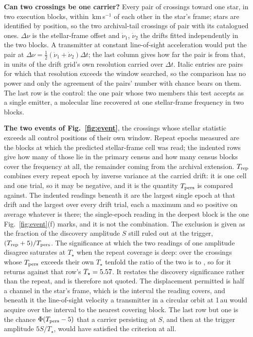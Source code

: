 \begin{table}
\centering
\caption{\textbf{Can two crossings be one carrier?} Every pair of crossings
toward one star, in two execution blocks, within
\WdHalfKms\,km\,s$^{-1}$ of each other in the star's frame; stars are
identified by position, so the two archival-tail crossings of \TjDeepStar{}
pair with its catalogued ones. $\Delta\nu$ is the stellar-frame offset and
$\dot\nu_1$, $\dot\nu_2$ the drifts fitted independently in the two blocks.
A transmitter at constant line-of-sight acceleration would put the pair at
$\Delta\nu=\frac{1}{2}(\dot\nu_1+\dot\nu_2)\Delta t$; the last column gives
how far the pair is from that, in units of the drift grid's own resolution
carried over $\Delta t$. Italic entries are pairs for which that resolution
exceeds the window searched, so the comparison has no power and only the
agreement of the pairs' number with chance bears on them. The last row is the
control: the one pair whose two members this test accepts as a single
emitter, a molecular line recovered at one stellar-frame frequency in two
blocks.}
\label{tab:pairs}
\scriptsize

\end{table}

\begin{table}
\centering
\caption{\textbf{The two events of Fig.~\ref{fig:event}}, the crossings whose
stellar statistic exceeds all \NCtrl{} control positions of their own window.
Repeat epochs measured are the blocks at which the predicted stellar-frame
cell was read; the indented rows give how many of those lie in the primary
census and how many census blocks cover the frequency at all, the remainder
coming from the archival extension.
$T_{\rm rep}$ combines every repeat epoch by inverse variance at the carried
drift: it is one cell and one trial, so it may be negative, and it is the
quantity $T_{\rm pers}$ is compared against. The indented readings beneath it
are the largest single epoch at that drift and the largest over every drift
trial, each a maximum and so positive on average whatever is there; the
single-epoch reading in the deepest block is the one Fig.~\ref{fig:event}(f)
marks, and it is not the combination. The exclusion is given as the fraction
of the discovery amplitude $S$ still ruled out at the trigger,
$(T_{\rm rep}+5)/T_{\rm pers}$. The significance at which the two readings of
one amplitude disagree saturates at $T_\star$ when the repeat coverage is
deep: over the \RqSatN{} crossings whose $T_{\rm pers}$ exceeds their own
$T_\star$ tenfold the ratio of the two is \RqSatRatioLo{} to
\RqSatRatioHi, so for \RqSatStar{} it returns \RqSatExcl{} against that row's
$T_\star=\RqSatTStar$. It restates the discovery significance rather than the
repeat, and is therefore not quoted. The displacement permitted
is half a channel in the star's frame, which is the interval the reading
covers, and beneath it the line-of-sight velocity a transmitter in a circular
orbit at 1\,au would acquire over the interval to the nearest covering block.
The last row but one is the chance $\Phi(T_{\rm pers}-5)$ that a carrier
persisting at $S$, and then at the trigger amplitude $5S/T_\star$, would have
satisfied the criterion at all.}
\label{tab:cand}
\footnotesize

\end{table}

